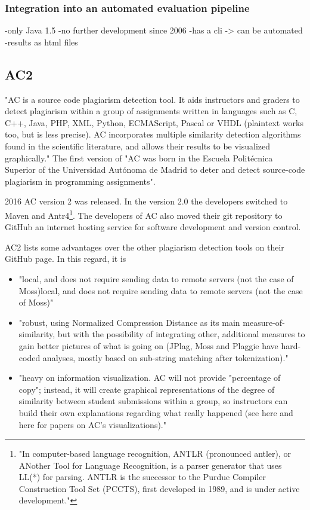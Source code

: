 \documentclass[a4paper, 11pt]{article}
\renewcommand{\\}{\vspace*{0.5\baselineskip} \newline}
\begin{document}
\subsubsection{Integration into an automated evaluation pipeline}

-only Java 1.5\autocite{PLAGGIE,RMP}
-no further development since 2006
-has a cli -> can be automated
-results as html files

\newpage

\subsection{AC2}

"AC is a source code plagiarism detection tool. It aids instructors and graders to detect plagiarism within a group of assignments written in languages such as C, C++, Java, PHP, XML, Python, ECMAScript, Pascal or VHDL (plaintext works too, but is less precise). AC incorporates multiple similarity detection algorithms found in the scientific literature, and allows their results to be visualized graphically." \autocite{AC2} The first version of "AC was born in the Escuela Politécnica Superior of the Universidad Autónoma de Madrid to deter and detect source-code plagiarism in programming assignments". \autocite{AC2}

2016 AC version 2 was released. In the version 2.0 the developers switched to Maven and Antr4\footnote{\label{footnoteAntlr}"In computer-based language recognition, ANTLR (pronounced antler), or ANother Tool for Language Recognition, is a parser generator that uses LL(*) for parsing. ANTLR is the successor to the Purdue Compiler Construction Tool Set (PCCTS), first developed in 1989, and is under active development."\autocite{enwiki:1115716413}}. The developers of AC also moved their git repository to GitHub an internet hosting service for software development and version control.

AC2 lists some advantages over the other plagiarism detection tools on their GitHub page. In this regard, it is

\begin{itemize}
	\item "local, and does not require sending data to remote servers (not the case of Moss)local, and does not require sending data to remote servers (not the case of Moss)"
	\item "robust, using Normalized Compression Distance as its main measure-of-similarity, but with the possibility of integrating other, additional measures to gain better pictures of what is going on (JPlag, Moss and Plaggie have hard-coded analyses, mostly based on sub-string matching after tokenization)."
	\item "heavy on information visualization. AC will not provide "percentage of copy"; instead, it will create graphical representations of the degree of similarity between student submissions within a group, so instructors can build their own explanations regarding what really happened (see here and here for papers on AC's visualizations)."
\end{itemize}\autocite{AC2}
\end{document}
